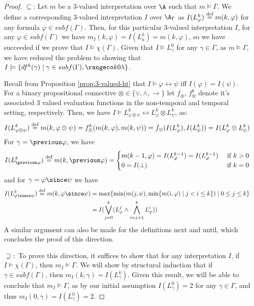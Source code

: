 \begin{proof}
  $\subseteq$: Let $m$ be a 3-valued interpretation over $\A$ such
  that $m \models \Gamma$. We define a corresponding 3-valued
  interpretation $I$ over $\A_{\Gamma}$ as
  $I(L^k_\varphi) \stackrel{\text{def}}{=} m(k,\varphi)$ for any formula
  $\varphi \in subf(\Gamma)$. Then, for this particular 3-valued
  interpretation $I$, for any $\varphi \in subf(\Gamma)$ we have
  $m_I(k,\varphi)=I(L_a^k)=m(k,\varphi)$, so we have succeeded if we
  prove that $I \models \chi(\Gamma)$. Given that
  $I \models L^0_\gamma$ for any $\gamma \in \Gamma$, as
  $m \models \Gamma$, we have reduced the problem to showing that
  $I \models \{ df^k(\gamma) \mid \gamma \in subf(\Gamma), \kinlambda
  \}$.

  Recall from Proposition \ref{prop:3-valued-ht} that
  $I \models \varphi \leftrightarrow \psi$ iff $I(\varphi) =
  I(\psi)$. For a binary propositional connective
  $\otimes \in \{ \vee, \wedge, \rightarrow \}$ let $f_{\otimes}$,
  $f_{\otimes}^k$ denote it's associated 3 valued evaluation functions
  in the non-temporal and temporal setting, respectively. Then, we
  have
  $I \models L^k_{\varphi \otimes \psi} \leftrightarrow L^k_\varphi
  \otimes L^k_\psi$, as:
  $$
  I(L^k_{\varphi \otimes \psi}) \stackrel{\text{def}}{=} m(k,\varphi \otimes \psi) 
  = f_{\otimes}^k(m(k,\varphi),m(k,\psi)) = f_{\otimes}(I(L^k_\varphi),I(L^k_\psi)) = I(L^k_{\varphi} \otimes L^k_{\psi})
  $$
  For $\gamma=\previous \varphi$, we have
  $$
  I(L^k_{\previous \varphi}) \defeq m(k,\previous \varphi) = \begin{cases}
    m(k-1,\varphi)=I(L^{k-1}_\varphi)=I(L^{k-1}_\varphi) &\text{ if } k > 0\\
    0=I(\bot) &\text{ if } k = 0
    \end{cases}
  $$
  and for $\gamma=\varphi \since \psi$ we have
  \begin{align*}
  I(L^k_{\varphi \since \psi}) \defeq m(k,\varphi \since \psi) &= \max \{\min (m(j, \psi), \min \{m(i, \varphi) \mid j<i \leq k\}) \mid 0 \leq j \leq k\} \\
    &= I(\bigvee_{j=0}^{k}(L_\psi^j \wedge \bigwedge_{i=j+1}^{k}L_{\varphi}^i))
  \end{align*}
  A similar argument can also be made for the definitions next and
  until, which concludes the proof of this direction.

  $\supseteq:$ To prove this direction, it suffices to show that for
  any interpretation $I$, if $I \models \chi(\Gamma)$, then
  $m_I \models \Gamma$. We will show by structural induction that if
  $\gamma \in subf(\Gamma)$, then $m_I(k,\gamma) = I(L^k_\gamma)$.
  Given this result, we will be able to conclude that
  $m_I \models \Gamma$, as by our initial assumption $I(L^0_\gamma)=2$
  for any $\gamma \in \Gamma$, and thus
  $m_I(0,\gamma)=I(L^0_\gamma)=2$.


\end{proof}
